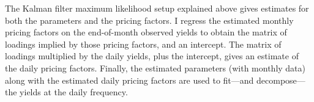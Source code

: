 {The Kalman filter maximum likelihood setup explained above gives estimates for both the parameters and the pricing factors.
I regress the estimated monthly pricing factors on the end-of-month observed yields to obtain the matrix of loadings implied by those pricing factors, and an intercept. 
The matrix of loadings multiplied by the daily yields, plus the intercept, gives an estimate of the daily pricing factors.
Finally, the estimated parameters (with monthly data) along with the estimated daily pricing factors are used to fit---and decompose---the yields at the daily frequency.

%


}
